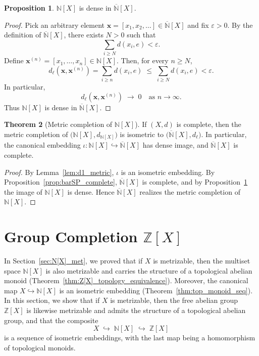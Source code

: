 \documentclass[10pt,a4paper]{article}
\theoremstyle{definition}
\newtheorem{theorem}{Theorem}[section]
\newtheorem{proposition}[theorem]{Proposition}
\newcommand{\Z}{\mathbb{Z}}
\newcommand{\N}{\mathbb{N}}
\begin{document}
\begin{proposition}\label{prop:finite_dense}
$\N[X]$ is dense in $\overline{\N}[X]$.
\end{proposition}
\begin{proof}
Pick an arbitrary element $\mathbf{x}=[x_1,x_2,\ldots] \in \overline{\N}[X]$ and
fix $\varepsilon > 0$. By the definition of $\overline{\N}[X]$, there exists
$N > 0$ such that
\[
\sum_{i \geq N} d(x_i, e) < \varepsilon.
\]
Define $\mathbf{x}^{(n)}=[x_1,\ldots,x_n] \in \N[X]$. Then, for every $n \geq N$,
\[
d_\ell(\mathbf{x}, \mathbf{x}^{(n)})
= \sum_{i \geq n} d(x_i, e)
\;\leq\; \sum_{i \geq N} d(x_i, e)
< \varepsilon.
\]
In particular,
\[
d_\ell(\mathbf{x}, \mathbf{x}^{(n)}) \;\longrightarrow\; 0
\quad\text{as } n \to \infty.
\]
Thus $\N[X]$ is dense in $\overline{\N}[X]$.
\end{proof}

\begin{theorem}[Metric completion of {$\N[X]$}]\label{thm:completion_NX}
If $(X,d)$ is complete, then the metric completion of $\bigl(\N[X],d_{\N[X]}\bigr)$
is isometric to $\bigl(\overline{\N}[X],d_\ell\bigr)$. In particular, the canonical
embedding $\iota:\N[X]\hookrightarrow \overline{\N}[X]$ has dense image, and
$\overline{\N}[X]$ is complete.
\end{theorem}

\begin{proof}
By Lemma~\ref{lem:d1_metric}, $\iota$ is an isometric embedding.
By Proposition~\ref{prop:barSP_complete}, $\overline{\N}[X]$ is complete,
and by Proposition~\ref{prop:finite_dense} the image of $\N[X]$ is dense.
Hence $\overline{\N}[X]$ realizes the metric completion of $\N[X]$.
\end{proof}


\section{Group Completion {$\Z[X]$}}
In Section~\ref{sec:N[X]_met}, we proved that if $X$ is metrizable, then the
multiset space $\N[X]$ is also metrizable and carries the structure of a
topological abelian monoid (Theorem~\ref{thm:Z[X]_topology_equivalence}). Moreover, the canonical map
$X \hookrightarrow \N[X]$ is an isometric embedding (Theorem~\ref{thm:top_monoid_seq}). In this section, we show
that if $X$ is metrizable, then the free abelian group $\Z[X]$ is likewise
metrizable and admits the structure of a topological abelian group, and that the
composite
\[
X \;\hookrightarrow\; \N[X] \;\hookrightarrow\; \Z[X]
\]
is a sequence of isometric embeddings, with the last map being a homomorphism of topological monoids.
\end{document}
